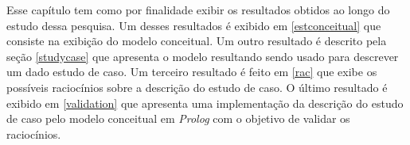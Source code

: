 Esse capítulo tem como por finalidade exibir os resultados obtidos ao longo do estudo dessa pesquisa. Um desses resultados é exibido em \ref{estconceitual} que consiste na exibição do modelo conceitual. Um outro resultado é descrito pela seção \ref{studycase} que apresenta o modelo resultando sendo usado para descrever um dado estudo de caso. Um terceiro resultado é feito em \ref{rac} que exibe os possíveis raciocínios sobre a descrição do estudo de caso. O último resultado é exibido em \ref{validation} que apresenta uma implementação da descrição do estudo de caso pelo modelo conceitual em \textit{Prolog} com o objetivo de validar os raciocínios.